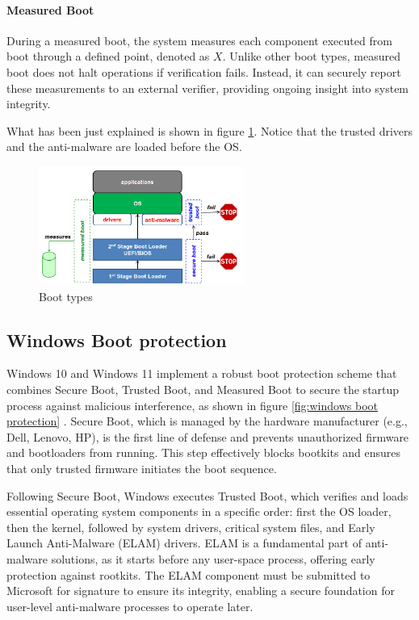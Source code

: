 \paragraph{Measured Boot} During a measured boot, the system 
measures each component executed from boot through a defined 
point, denoted as \(X\). Unlike other boot types, measured boot 
does not halt operations if verification fails. Instead, it can securely 
report these measurements to an external verifier, providing 
ongoing insight into system integrity.

What has been just explained is shown in figure \ref{fig:boot types}.
Notice that the trusted drivers and the anti-malware are loaded before
the OS.
\begin{figure}[H]
  \centering
  \includegraphics[width=0.6\textwidth]{img/boot types.png}
  \caption{Boot types}
  \label{fig:boot types}
\end{figure}

\subsection*{Windows Boot protection}

Windows 10 and Windows 11 implement a robust boot protection scheme
that combines Secure Boot, Trusted Boot, and Measured Boot to secure
the startup process against malicious interference, as shown in figure
\ref{fig:windows boot protection} . Secure Boot, which is managed by
the hardware manufacturer (e.g., Dell, Lenovo, HP), is the first line
of defense and prevents unauthorized firmware and bootloaders from
running. This step effectively blocks bootkits and ensures that only
trusted firmware initiates the boot sequence.

Following Secure Boot, Windows executes Trusted Boot, which verifies
and loads essential operating system components in a specific order:
first the OS loader, then the kernel, followed by system drivers,
critical system files, and Early Launch Anti-Malware (ELAM) drivers.
ELAM is a fundamental part of anti-malware solutions, as it starts
before any user-space process, offering early protection against
rootkits. The ELAM component must be submitted to Microsoft for
signature to ensure its integrity, enabling a secure foundation for
user-level anti-malware processes to operate later.

